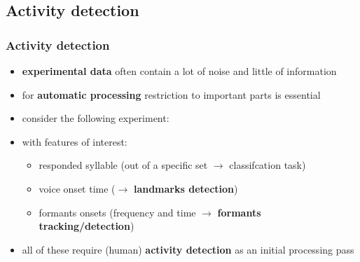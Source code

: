 
\subsection{Activity detection}

\begin{frame} %
	\frametitle{Activity detection}
	\begin{itemize}
		\item \textbf{experimental data} often contain a lot of noise and little of information
		\item for \textbf{automatic processing} restriction to important parts is essential
		\item consider the following experiment:
			\begin{figure}
				\centering
				\begin{subfigure}[c]{0.8\linewidth}
				\end{subfigure}
			\end{figure}
		\item with features of interest:
			\begin{itemize}
				\item responded syllable (out of a specific set $\rightarrow$ classifcation task)
				\item voice onset time ($\rightarrow$ \textbf{landmarks detection})
				\item formants onsets (frequency and time $\rightarrow$ \textbf{formants tracking/detection})
			\end{itemize}
		\item all of these require (human) \textbf{activity detection} as an initial processing pass
	\end{itemize}
\end{frame}

